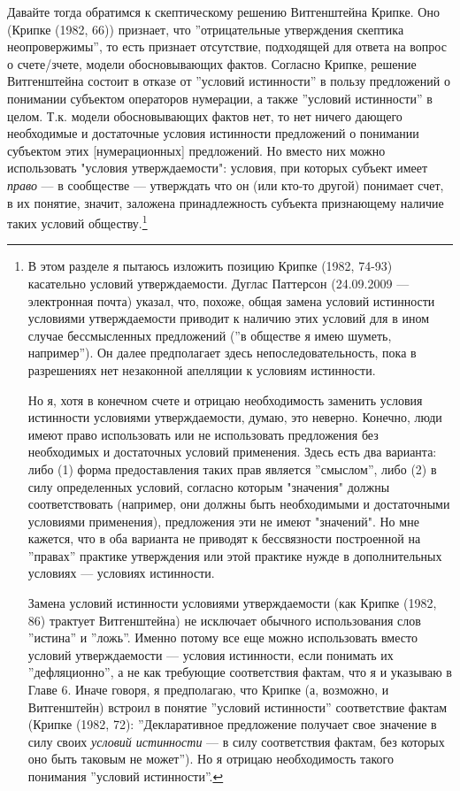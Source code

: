 \documentclass[11pt]{book}
\begin{document}
Давайте тогда обратимся к скептическому решению Витгенштейна Крипке. Оно (Крипке (1982, 66)) признает, что ''отрицательные утверждения скептика неопровержимы'', то есть признает отсутствие, подходящей для ответа на вопрос о счете/зчете, модели обосновывающих фактов. Согласно Крипке, решение Витгенштейна состоит в отказе от ''условий истинности'' в пользу предложений о понимании субъектом операторов нумерации, а также ''условий истинности'' в целом. Т.к. модели обосновывающих фактов нет, то нет ничего дающего необходимые и достаточные условия истинности предложений о понимании субъектом этих [нумерационных] предложений. Но вместо них можно использовать "условия утверждаемости": условия, при которых субъект имеет \textit{право} --- в сообществе --- утверждать что он (или кто-то другой) понимает счет, в их понятие, значит, заложена принадлежность субъекта признающему наличие таких условий обществу.\footnote{В этом разделе я пытаюсь изложить позицию Крипке (1982, 74-93) касательно условий утверждаемости. Дуглас Паттерсон (24.09.2009 --- электронная почта) указал, что, похоже, общая замена условий истинности условиями утверждаемости приводит к наличию этих условий для в ином случае бессмысленных предложений (''в обществе я имею шуметь, например''). Он далее предполагает здесь непоследовательность, пока в разрешениях нет незаконной апелляции к условиям истинности.

Но я, хотя в конечном счете и отрицаю необходимость заменить условия истинности условиями утверждаемости, думаю, это неверно. Конечно, люди имеют право использовать или не использовать предложения без необходимых и достаточных условий применения. Здесь есть два варианта: либо (1) форма предоставления таких прав является ''смыслом'', либо (2) в силу определенных условий, согласно которым "значения" должны соответствовать (например, они должны быть необходимыми и достаточными условиями применения), предложения эти не имеют "значений". Но мне кажется, что в оба варианта не приводят к бессвязности построенной на ''правах'' практике утверждения или этой практике нужде в дополнительных условиях --- условиях истинности.

Замена условий истинности условиями утверждаемости (как Крипке (1982, 86) трактует Витгенштейна) не исключает обычного использования слов ''истина'' и ''ложь''. Именно потому все еще можно использовать вместо условий утверждаемости --- условия истинности, если понимать их ''дефляционно'', а не как требующие соответствия фактам, что я и указываю в Главе 6. Иначе говоря, я предполагаю, что Крипке (а, возможно, и Витгенштейн) встроил в понятие ''условий истинности'' соответствие фактам (Крипке (1982, 72): ''Декларативное предложение получает свое значение в силу своих \textit{условий истинности} --- в силу соответствия фактам, без которых оно быть таковым не может''). Но я отрицаю необходимость такого понимания ''условий истинности''.}
\end{document}
